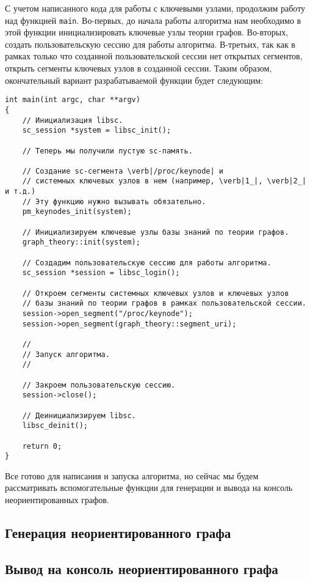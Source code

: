 С учетом написанного кода для работы с ключевыми узлами, продолжим
работу над функцией \lstinline|main|. Во-первых, до начала работы
алгоритма нам необходимо в этой функции инициализировать ключевые узлы
теории графов. Во-вторых, создать пользовательскую сессию для работы
алгоритма. В-третьих, так как в рамках только что созданной
пользовательской сессии нет открытых сегментов, открыть сегменты
ключевых узлов в созданной сессии. Таким образом, окончательный
вариант разрабатываемой функции будет следующим:
\begin{lstlisting}[texcl]
int main(int argc, char **argv)
{
    // Инициализация libsc.
    sc_session *system = libsc_init();

    // Теперь мы получили пустую sc-память.

    // Создание sc-сегмента \verb|/proc/keynode| и
    // системных ключевых узлов в нем (например, \verb|1_|, \verb|2_| и т.д.)
    // Эту функцию нужно вызывать обязательно.
    pm_keynodes_init(system);

    // Инициализируем ключевые узлы базы знаний по теории графов.
    graph_theory::init(system);

    // Создадим пользовательскую сессию для работы алгоритма.
    sc_session *session = libsc_login();

    // Откроем сегменты системных ключевых узлов и ключевых узлов
    // базы знаний по теории графов в рамках пользовательской сессии.
    session->open_segment("/proc/keynode");
    session->open_segment(graph_theory::segment_uri);

    //
    // Запуск алгоритма.
    //

    // Закроем пользовательскую сессию.
    session->close();

    // Деинициализируем libsc.
    libsc_deinit();

    return 0;
}
\end{lstlisting}

Все готово для написания и запуска алгоритма, но сейчас мы будем
рассматривать вспомогательные функции для генерации и вывода на
консоль неориентированных графов.

\subsection{Генерация неориентированного графа}

\subsection{Вывод на консоль неориентированного графа}

